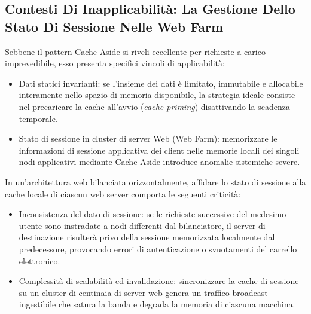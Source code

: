 \documentclass[11pt, a4paper]{article}
\begin{document}
\subsection{Contesti Di Inapplicabilità: La Gestione Dello Stato Di Sessione Nelle Web Farm}

Sebbene il pattern Cache-Aside si riveli eccellente per richieste a carico imprevedibile, esso presenta specifici vincoli di applicabilità:
\begin{itemize}[noitemsep]
    \item Dati statici invarianti: se l'insieme dei dati è limitato, immutabile e allocabile interamente nello spazio di memoria disponibile, la strategia ideale consiste nel precaricare la cache all'avvio (\emph{cache priming}) disattivando la scadenza temporale.
    \item Stato di sessione in cluster di server Web (Web Farm): memorizzare le informazioni di sessione applicativa dei client nelle memorie locali dei singoli nodi applicativi mediante Cache-Aside introduce anomalie sistemiche severe.
\end{itemize}

In un'architettura web bilanciata orizzontalmente, affidare lo stato di sessione alla cache locale di ciascun web server comporta le seguenti criticità:
\begin{itemize}[noitemsep]
    \item Inconsistenza del dato di sessione: se le richieste successive del medesimo utente sono instradate a nodi differenti dal bilanciatore, il server di destinazione risulterà privo della sessione memorizzata localmente dal predecessore, provocando errori di autenticazione o svuotamenti del carrello elettronico.
    \item Complessità di scalabilità ed invalidazione: sincronizzare la cache di sessione su un cluster di centinaia di server web genera un traffico broadcast ingestibile che satura la banda e degrada la memoria di ciascuna macchina.
\end{itemize}
\end{document}
